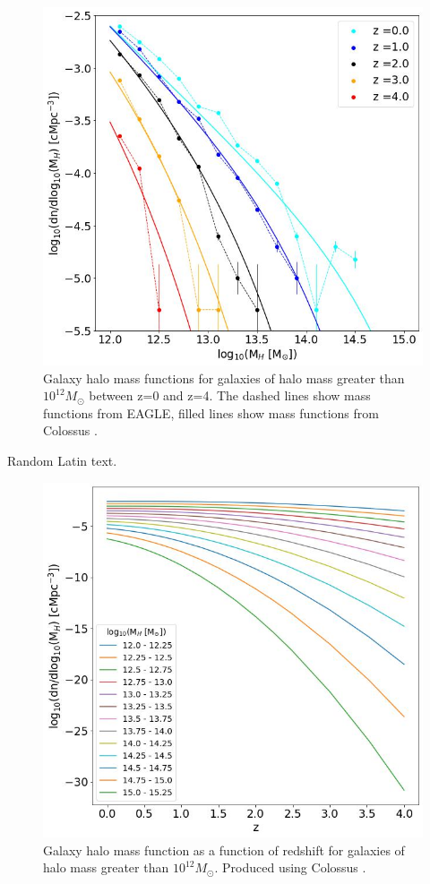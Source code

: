 \documentclass[12pt, twocolumn]{revtex4}    %
\begin{document}
\onecolumngrid


\begin{figure}[H]
\centering
\includegraphics[width=\linewidth]{Mass_Function.jpeg}
\caption{Galaxy halo mass functions for galaxies of halo mass greater than $10^{12}M_\odot$ between z=0 and z=4. The dashed lines show mass functions from EAGLE, filled lines show mass functions from Colossus \cite{Colossus}.}
\label{fig:5}
\end{figure}
\twocolumngrid


Random Latin text.

\onecolumngrid


\begin{figure}[H]
\centering
\includegraphics[width=\linewidth]{Mass_Function_2.jpeg}
\caption{Galaxy halo mass function as a function of redshift for galaxies of halo mass greater than $10^{12}M_\odot$. Produced using Colossus \cite{Colossus}.}
\label{fig:6}
\end{figure}
\twocolumngrid
\end{document}
